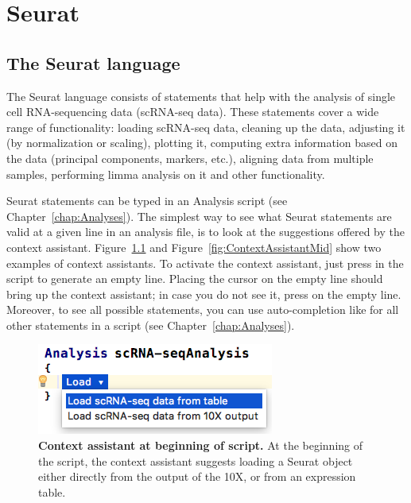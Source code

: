 


\chapter{Seurat}\label{chap:Seurat}

\section{The Seurat language}

The Seurat language consists of statements that help with the analysis of
single cell RNA-sequencing data (scRNA-seq data). These statements cover a wide range of
functionality: loading scRNA-seq data, cleaning up the data, adjusting it (by normalization
or scaling), plotting it, computing extra information based on the data (principal components, markers,
etc.), aligning data from multiple samples, performing limma analysis on it and other
functionality.

Seurat statements can be typed in an Analysis script (see Chapter~\ref{chap:Analyses}).
The simplest way to see what Seurat statements are valid at a given line in an
analysis file, is to look at the suggestions offered by the context assistant. Figure~\ref{fig:ContextAssistantBeg}
and Figure~\ref{fig:ContextAssistantMid} show two examples of context assistants.
To activate the context assistant, just press
\keys{\return} in the script to generate an empty line. Placing the cursor on the empty line should
bring up the context assistant; in case you do not see it, press \keys{\space} on the empty line.
Moreover, to see all possible statements, you can use auto-completion like for all other
statements in a script (see Chapter~\ref{chap:Analyses}).

\begin{figure}
  \centering
  \includegraphics[width=\figWidthTiny]{figures/ContextAssistantBeg.png}
    \caption[Context assistant at beginning of script.]{\textbf{Context assistant at
    beginning of script.} At the beginning of the script, the
    context assistant suggests loading a Seurat object either directly from the output
    of the 10X, or from an expression table.}
\label{fig:ContextAssistantBeg}
\end{figure}


